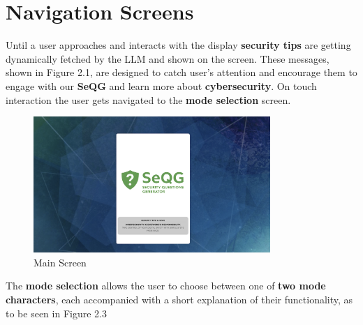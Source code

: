 \section{Navigation Screens}

Until a user approaches and interacts with the display \textbf{security tips} are getting dynamically fetched by the LLM and shown on the screen.
These messages, shown in Figure 2.1, are designed to catch user's attention and encourage them to engage with our \textbf{SeQG} and learn more about \textbf{cybersecurity}.
On touch interaction the user gets navigated to the \textbf{mode selection} screen.

\begin{figure}[H]
    \centering
    \includegraphics[width=0.8\textwidth]{images/MainScreen1.png}
    \caption{Main Screen}
\end{figure}

The \textbf{mode selection} allows the user to choose between one of \textbf{two mode characters}, each accompanied 
with a short explanation of their functionality, as to be seen in Figure 2.3

